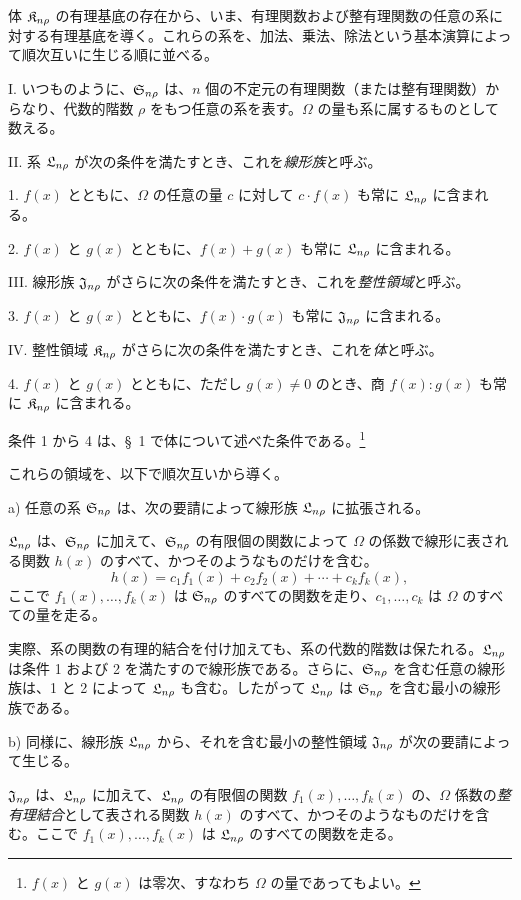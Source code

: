 \documentclass[11pt]{jlreq}
\begin{document}
体 $\mathfrak{K}_{n\rho}$ の有理基底の存在から、いま、有理関数および整有理関数の任意の系に対する有理基底を導く。これらの系を、加法、乗法、除法という基本演算によって順次互いに生じる順に並べる。

I. いつものように、$\mathfrak{S}_{n\rho}$ は、$n$ 個の不定元の有理関数（または整有理関数）からなり、代数的階数 $\rho$ をもつ任意の系を表す。$\Omega$ の量も系に属するものとして数える。

II. 系 $\mathfrak{L}_{n\rho}$ が次の条件を満たすとき、これを\emph{線形族}と呼ぶ。

1. $f(x)$ とともに、$\Omega$ の任意の量 $c$ に対して $c\cdot f(x)$ も常に $\mathfrak{L}_{n\rho}$ に含まれる。

2. $f(x)$ と $g(x)$ とともに、$f(x)+g(x)$ も常に $\mathfrak{L}_{n\rho}$ に含まれる。

III. 線形族 $\mathfrak{J}_{n\rho}$ がさらに次の条件を満たすとき、これを\emph{整性領域}と呼ぶ。

3. $f(x)$ と $g(x)$ とともに、$f(x)\cdot g(x)$ も常に $\mathfrak{J}_{n\rho}$ に含まれる。

IV. 整性領域 $\mathfrak{K}_{n\rho}$ がさらに次の条件を満たすとき、これを\emph{体}と呼ぶ。

4. $f(x)$ と $g(x)$ とともに、ただし $g(x)\ne0$ のとき、商 $f(x):g(x)$ も常に $\mathfrak{K}_{n\rho}$ に含まれる。

条件 1 から 4 は、\S\ 1 で体について述べた条件である。\footnote{$f(x)$ と $g(x)$ は零次、すなわち $\Omega$ の量であってもよい。}

これらの領域を、以下で順次互いから導く。

a) 任意の系 $\mathfrak{S}_{n\rho}$ は、次の要請によって線形族 $\mathfrak{L}_{n\rho}$ に拡張される。

$\mathfrak{L}_{n\rho}$ は、$\mathfrak{S}_{n\rho}$ に加えて、$\mathfrak{S}_{n\rho}$ の有限個の関数によって $\Omega$ の係数で線形に表される関数 $h(x)$ のすべて、かつそのようなものだけを含む。
\[
  h(x)=c_1f_1(x)+c_2f_2(x)+\cdots+c_kf_k(x),
\]
ここで $f_1(x),\ldots,f_k(x)$ は $\mathfrak{S}_{n\rho}$ のすべての関数を走り、$c_1,\ldots,c_k$ は $\Omega$ のすべての量を走る。

実際、系の関数の有理的結合を付け加えても、系の代数的階数は保たれる。$\mathfrak{L}_{n\rho}$ は条件 1 および 2 を満たすので線形族である。さらに、$\mathfrak{S}_{n\rho}$ を含む任意の線形族は、1 と 2 によって $\mathfrak{L}_{n\rho}$ も含む。したがって $\mathfrak{L}_{n\rho}$ は $\mathfrak{S}_{n\rho}$ を含む最小の線形族である。

b) 同様に、線形族 $\mathfrak{L}_{n\rho}$ から、それを含む最小の整性領域 $\mathfrak{J}_{n\rho}$ が次の要請によって生じる。

$\mathfrak{J}_{n\rho}$ は、$\mathfrak{L}_{n\rho}$ に加えて、$\mathfrak{L}_{n\rho}$ の有限個の関数 $f_1(x),\ldots,f_k(x)$ の、$\Omega$ 係数の\emph{整有理結合}として表される関数 $h(x)$ のすべて、かつそのようなものだけを含む。ここで $f_1(x),\ldots,f_k(x)$ は $\mathfrak{L}_{n\rho}$ のすべての関数を走る。
\end{document}
